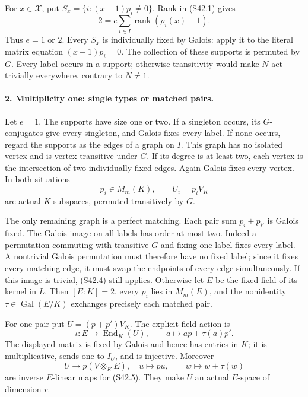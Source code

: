 For \(x\in\mathcal X\), put
\(S_x=\{i:(x-1)p_i\ne0\}\). Rank in (S42.1) gives
\[
              2=e\sum_{i\in I}
                   \operatorname{rank}(\rho_i(x)-1).       \tag{S42.3}
\]
Thus \(e=1\) or \(2\). Every \(S_x\) is individually
fixed by Galois: apply it to the literal matrix equation
\((x-1)p_i=0\). The collection of these supports is
permuted by \(G\). Every label occurs in a support;
otherwise transitivity would make \(N\) act trivially
everywhere, contrary to \(N\ne1\).

\paragraph{2. Multiplicity one: single types or matched pairs.}
Let \(e=1\). The supports have size one or two. If a
singleton occurs, its \(G\)-conjugates give every singleton,
and Galois fixes every label. If none occurs, regard the
supports as the edges of a graph on \(I\). This graph
has no isolated vertex and is vertex-transitive under
\(G\). If its degree is at least two, each vertex is
the intersection of two individually fixed edges. Again
Galois fixes every vertex. In both situations
\[
                   p_i\in M_m(K),\qquad U_i=p_iV_K
                                                               \tag{S42.4}
\]
are actual \(K\)-subspaces, permuted transitively by \(G\).

The only remaining graph is a perfect matching. Each pair
sum \(p_i+p_{i'}\) is Galois fixed. The Galois image on
all labels has order at most two. Indeed a permutation
commuting with transitive \(G\) and fixing one label fixes
every label. A nontrivial Galois permutation must therefore
have no fixed label; since it fixes every matching edge, it
must swap the endpoints of every edge simultaneously.
If this image is trivial, (S42.4) still applies. Otherwise
let \(E\) be the fixed field of its kernel in \(L\).
Then \([E:K]=2\), every \(p_i\) lies in \(M_m(E)\),
and the nonidentity \(\tau\in\operatorname{Gal}(E/K)\)
exchanges precisely each matched pair.

For one pair put \(U=(p+p')V_K\). The explicit field
action is
\[
 \iota:E\longrightarrow\operatorname{End}_K(U),\qquad
                     a\longmapsto ap+\tau(a)p'.             \tag{S42.5}
\]
The displayed matrix is fixed by Galois and hence has entries
in \(K\); it is multiplicative, sends one to \(I_U\),
and is injective. Moreover
\[
 U\longrightarrow p(V\otimes_K E),\quad u\longmapsto pu,
 \qquad w\longmapsto w+\tau(w)                              \tag{S42.6}
\]
are inverse \(E\)-linear maps for (S42.5). They make \(U\)
an actual \(E\)-space of dimension \(r\).

